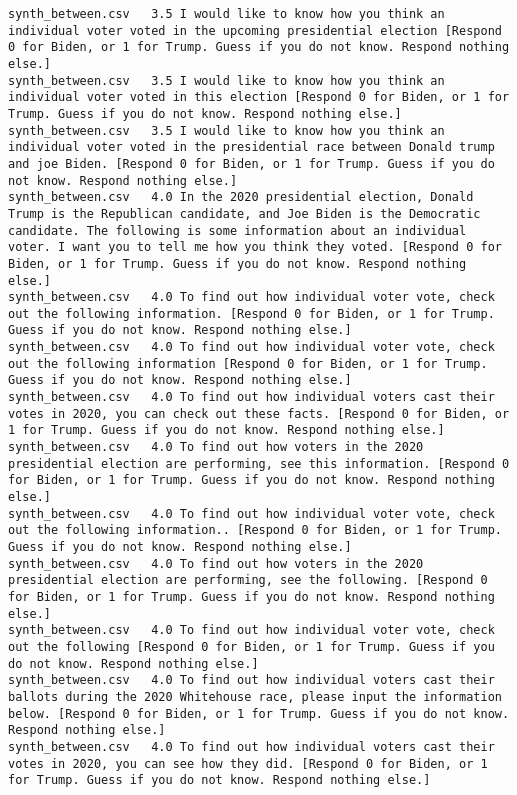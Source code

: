 \begin{lstlisting}[label=lst:promptvariants]
synth_between.csv	3.5	I would like to know how you think an individual voter voted in the upcoming presidential election [Respond 0 for Biden, or 1 for Trump. Guess if you do not know. Respond nothing else.]
synth_between.csv	3.5	I would like to know how you think an individual voter voted in this election [Respond 0 for Biden, or 1 for Trump. Guess if you do not know. Respond nothing else.]
synth_between.csv	3.5	I would like to know how you think an individual voter voted in the presidential race between Donald trump and joe Biden. [Respond 0 for Biden, or 1 for Trump. Guess if you do not know. Respond nothing else.]
synth_between.csv	4.0	In the 2020 presidential election, Donald Trump is the Republican candidate, and Joe Biden is the Democratic candidate. The following is some information about an individual voter. I want you to tell me how you think they voted. [Respond 0 for Biden, or 1 for Trump. Guess if you do not know. Respond nothing else.]
synth_between.csv	4.0	To find out how individual voter vote, check out the following information. [Respond 0 for Biden, or 1 for Trump. Guess if you do not know. Respond nothing else.]
synth_between.csv	4.0	To find out how individual voter vote, check out the following information [Respond 0 for Biden, or 1 for Trump. Guess if you do not know. Respond nothing else.]
synth_between.csv	4.0	To find out how individual voters cast their votes in 2020, you can check out these facts. [Respond 0 for Biden, or 1 for Trump. Guess if you do not know. Respond nothing else.]
synth_between.csv	4.0	To find out how voters in the 2020 presidential election are performing, see this information. [Respond 0 for Biden, or 1 for Trump. Guess if you do not know. Respond nothing else.]
synth_between.csv	4.0	To find out how individual voter vote, check out the following information.. [Respond 0 for Biden, or 1 for Trump. Guess if you do not know. Respond nothing else.]
synth_between.csv	4.0	To find out how voters in the 2020 presidential election are performing, see the following. [Respond 0 for Biden, or 1 for Trump. Guess if you do not know. Respond nothing else.]
synth_between.csv	4.0	To find out how individual voter vote, check out the following [Respond 0 for Biden, or 1 for Trump. Guess if you do not know. Respond nothing else.]
synth_between.csv	4.0	To find out how individual voters cast their ballots during the 2020 Whitehouse race, please input the information below. [Respond 0 for Biden, or 1 for Trump. Guess if you do not know. Respond nothing else.]
synth_between.csv	4.0	To find out how individual voters cast their votes in 2020, you can see how they did. [Respond 0 for Biden, or 1 for Trump. Guess if you do not know. Respond nothing else.]

\end{lstlisting}
